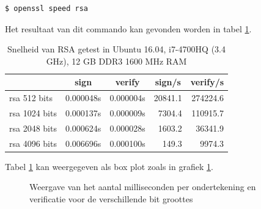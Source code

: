 \begin{lstlisting}[language=bash, caption={Commando om de snelheid van RSA te
testen}]
$ openssl speed rsa
\end{lstlisting}

Het resultaat van dit commando kan gevonden worden in tabel
\ref{tab:rsa-speed-test}.

\begin{table}[H]
	\centering
	\begin{tabular}{ l | l | l | r | r }
		& \multicolumn{1}{c}{sign} & \multicolumn{1}{c}{verify} &
		\multicolumn{1}{c}{sign/s} & \multicolumn{1}{c}{verify/s} \\
		\hline
		rsa  512 bits & 0.000048s & 0.000004s &  20841.1 & 274224.6 \\
		rsa 1024 bits & 0.000137s & 0.000009s &   7304.4 & 110915.7 \\
		rsa 2048 bits & 0.000624s & 0.000028s &   1603.2 &  36341.9 \\
		rsa 4096 bits & 0.006696s & 0.000100s &    149.3 &   9974.3 \\
	\end{tabular}
	\caption{Snelheid van RSA getest in Ubuntu 16.04, i7-4700HQ (3.4 GHz), 12 GB
		DDR3 1600 MHz RAM}
	\label{tab:rsa-speed-test}
\end{table}

Tabel \ref{tab:rsa-speed-test} kan weergegeven als box plot zoals in grafiek
\ref{fig:rsa-sign-verify-speed-graph}.

\begin{figure}[H]
	\centering
	\caption{Weergave van het aantal milliseconden per ondertekening en verificatie
		voor de verschillende bit groottes}
	\label{fig:rsa-sign-verify-speed-graph}
\end{figure}

